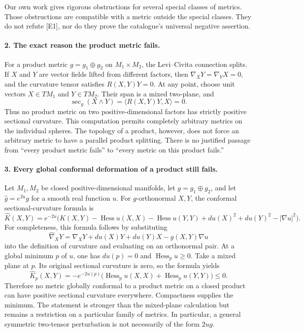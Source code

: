 \documentclass[11pt]{article}
\begin{document}
Our own work gives rigorous obstructions for several special classes of metrics. Those obstructions are compatible with a metric outside the special classes. They do not refute [E1], nor do they prove the catalogue's universal negative assertion.

\paragraph{2. The exact reason the product metric fails.}
For a product metric $g=g_1\oplus g_2$ on $M_1\times M_2$, the Levi--Civita connection splits. If $X$ and $Y$ are vector fields lifted from different factors, then $\nabla_XY=\nabla_YX=0$, and the curvature tensor satisfies $R(X,Y)Y=0$. At any point, choose unit vectors $X\in TM_1$ and $Y\in TM_2$. Their span is a mixed two-plane, and
\[
 \sec_g(X\wedge Y)=\langle R(X,Y)Y,X\rangle=0.
\]
Thus no product metric on two positive-dimensional factors has strictly positive sectional curvature. This computation permits completely arbitrary metrics on the individual spheres. The topology of a product, however, does not force an arbitrary metric to have a parallel product splitting. There is no justified passage from ``every product metric fails'' to ``every metric on this product fails.''

\paragraph{3. Every global conformal deformation of a product still fails.}
Let $M_1,M_2$ be closed positive-dimensional manifolds, let $g=g_1\oplus g_2$, and let $\widehat g=e^{2u}g$ for a smooth real function $u$. For $g$-orthonormal $X,Y$, the conformal sectional-curvature formula is
\[
 \widehat K(X,Y)=e^{-2u}\bigl(K(X,Y)
 -\operatorname{Hess}u(X,X)-\operatorname{Hess}u(Y,Y)
 +du(X)^2+du(Y)^2-|\nabla u|^2\bigr).
\]
For completeness, this formula follows by substituting
\[
 \widehat\nabla_XY=\nabla_XY+du(X)Y+du(Y)X-g(X,Y)\nabla u
\]
into the definition of curvature and evaluating on an orthonormal pair. At a global minimum $p$ of $u$, one has $du(p)=0$ and $\operatorname{Hess}_p u\geq0$. Take a mixed plane at $p$. Its original sectional curvature is zero, so the formula yields
\[
 \widehat K_p(X,Y)
 =-e^{-2u(p)}\bigl(\operatorname{Hess}_p u(X,X)
 +\operatorname{Hess}_p u(Y,Y)\bigr)\leq0.
\]
Therefore no metric globally conformal to a product metric on a closed product can have positive sectional curvature everywhere. Compactness supplies the minimum. The statement is stronger than the mixed-plane calculation but remains a restriction on a particular family of metrics. In particular, a general symmetric two-tensor perturbation is not necessarily of the form $2u g$.
\end{document}
